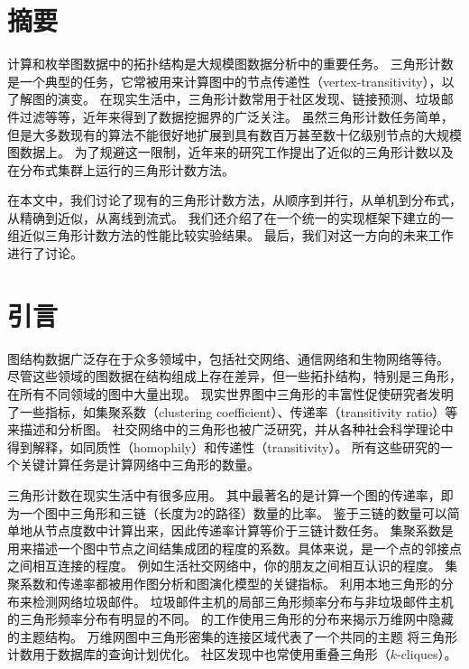 \section{摘要}

计算和枚举图数据中的拓扑结构是大规模图数据分析中的重要任务。
三角形计数是一个典型的任务，它常被用来计算图中的节点传递性（vertex-transitivity），以了解图的演变。
在现实生活中，三角形计数常用于社区发现、链接预测、垃圾邮件过滤等等，近年来得到了数据挖掘界的广泛关注。
虽然三角形计数任务简单，但是大多数现有的算法不能很好地扩展到具有数百万甚至数十亿级别节点的大规模图数据上。
为了规避这一限制，近年来的研究工作提出了近似的三角形计数以及在分布式集群上运行的三角形计数方法。

在本文中，我们讨论了现有的三角形计数方法，从顺序到并行，从单机到分布式，从精确到近似，从离线到流式。
我们还介绍了在一个统一的实现框架下建立的一组近似三角形计数方法的性能比较实验结果。
最后，我们对这一方向的未来工作进行了讨论。

\section{引言}

图结构数据广泛存在于众多领域中，包括社交网络、通信网络和生物网络等待。
尽管这些领域的图数据在结构组成上存在差异，但一些拓扑结构，特别是三角形，在所有不同领域的图中大量出现。
现实世界图中三角形的丰富性促使研究者发明了一些指标，如集聚系数（clustering coefficient）\citep{watts1998collective}、传递率（transitivity ratio）\citep{holland1971transitivity}等来描述和分析图。
社交网络中的三角形也被广泛研究，并从各种社会科学理论中得到解释，如同质性（homophily）\citep{mcpherson2001birds}和传递性（transitivity）\citep{holland1971transitivity}。
所有这些研究的一个关键计算任务是计算网络中三角形的数量。

三角形计数在现实生活中有很多应用。
其中最著名的是计算一个图的传递率，即为一个图中三角形和三链（长度为2的路径）数量的比率。
鉴于三链的数量可以简单地从节点度数中计算出来，因此传递率计算等价于三链计数任务。
集聚系数是用来描述一个图中节点之间结集成团的程度的系数。具体来说，是一个点的邻接点之间相互连接的程度。
例如生活社交网络中，你的朋友之间相互认识的程度。
集聚系数和传递率都被用作图分析和图演化模型的关键指标\citep{aggarwal2014evolutionary}。
\cite{becchetti2008efficient}利用本地三角形的分布来检测网络垃圾邮件。
垃圾邮件主机的局部三角形频率分布与非垃圾邮件主机的三角形频率分布有明显的不同。
\cite{eckmann2002curvature}的工作使用三角形的分布来揭示万维网中隐藏的主题结构。
万维网图中三角形密集的连接区域代表了一个共同的主题
\cite{bar2002reductions}将三角形计数用于数据库的查询计划优化。
社区发现中也常使用重叠三角形（$k$-cliques）\citep{palla2005uncovering}。

